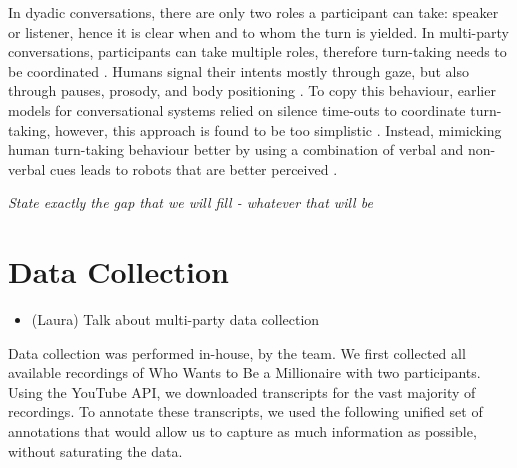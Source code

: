 \documentclass[hidelinks, 11pt]{article}
\begin{document}
In dyadic conversations, there are only two roles a participant can take: speaker or listener, hence it is clear when and to whom the turn is yielded. In multi-party conversations, participants can take multiple roles, therefore turn-taking needs to be coordinated \cite{Johansson_Skantze_2015}. Humans signal their intents mostly through gaze, but also through pauses, prosody, and body positioning \cite{Żarkowski_2019}. To copy this behaviour, earlier models for conversational systems relied on silence time-outs to coordinate turn-taking, however, this approach is found to be too simplistic \cite{skantze_turn_taking_2021}. Instead, mimicking human turn-taking behaviour better by using a combination of verbal and non-verbal cues leads to robots that are better perceived \cite{moujahid_multi_party_2022}.

\textit{State exactly the gap that we will fill - whatever that will be}


\section{Data Collection}
\label{sec:data_collection}

\begin{itemize}
  \item (Laura) Talk about multi-party data collection
\end{itemize}

Data collection was performed in-house, by the team. We first collected all available recordings of Who Wants to Be a Millionaire with two participants. Using the YouTube API, we downloaded transcripts for the vast majority of recordings. To annotate these transcripts, we used the following unified set of annotations that would allow us to capture as much information as possible, without saturating the data. \\
\end{document}
